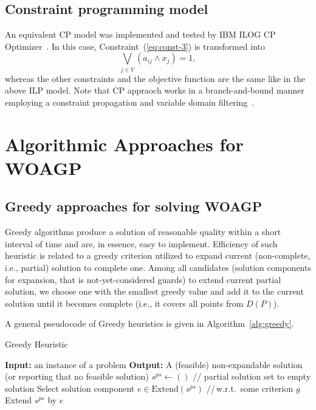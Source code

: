 \documentclass[runningheads,a4paper]{elsarticle}
\begin{document}
	\subsection{Constraint programming model} An equivalent CP model was implemented and tested by IBM ILOG CP Optimizer~\cite{laborie2018ibm}. In this case,  Constraint~(\ref{eq:const-3}) is transformed into
	\begin{equation}
	\bigvee_{ j \in V } (a_{ij} \wedge x_j) = 1,
	\end{equation}
	whereas the other constraints and the objective function are the same like in the above ILP model. Note that CP appraoch works in a branch-and-bound manner employing a constraint propagation and variable domain filtering~\cite{rossi2006handbook}.
	\section{Algorithmic Approaches for WOAGP}
	\subsection{Greedy approaches for solving WOAGP}
 Greedy algorithms produce a solution of reasonable quality within a short interval of time and are, in essence, easy to implement. Efficiency of such  heuristic is related to a greedy criterion utilized to expand current (non-complete, i.e., partial) solution to complete one. Among all candidates (solution components for expansion, that is not-yet-considered guards) to extend current partial solution,  we choose one with the smallest greedy value and add it to the current solution until it becomes complete (i.e., it covers all  points from $D(P)$).
	
	A general pseudocode of Greedy heuristics is given in Algorithm~\ref{alg:greedy}.
	
	\begin{algorithm}[!t]
		\caption{Greedy Heuristic}\label{alg:greedy}
		\begin{algorithmic}[1]
			\State \textbf{Input:} an instance of a problem
			\State \textbf{Output:} A (feasible) non-expandable solution (or reporting that no feasible solution)
			\State $s^{ps} \gets ()$ \hspace{0.3cm}// partial solution set to empty solution
			\State Select solution component $e \in  \text{Extend}(s^{ps})$ \hspace{0.3cm}//\,w.r.t.\  some criterion $g$
			\State Extend $s^{ps}$ by $e$
			\EndWhile
		\end{algorithmic}
	\end{algorithm}
\end{document}
